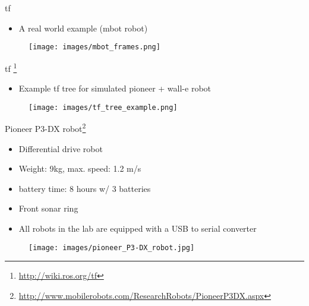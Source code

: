 \documentclass{beamer}
\begin{document}

\begin{frame}{tf}
	\begin{itemize}
		\item A real world example (mbot robot)
	\end{itemize}
	
	\begin{figure}[H]
		\centering
		\texttt{[image: images/mbot\_frames.png]}
	\end{figure}
	
\end{frame}


\begin{frame}{tf \footnote{\url{http://wiki.ros.org/tf}}}
	\begin{itemize}
		\item Example tf tree for simulated pioneer + wall-e robot
	\end{itemize}
	
	\begin{figure}[H]
		\centering
		\texttt{[image: images/tf\_tree\_example.png]}
	\end{figure}
	
\end{frame}


\begin{frame}{Pioneer P3-DX robot\footnote{\url{http://www.mobilerobots.com/ResearchRobots/PioneerP3DX.aspx}}}
	\begin{itemize}
		\item Differential drive robot
		\item Weight: 9kg, max. speed: 1.2 m/s
		\item battery time: 8 hours w/ 3 batteries
		\item Front sonar ring
		\item All robots in the lab are equipped with a USB to serial converter
	\end{itemize}
	
	\begin{figure}[H]
		\centering
		\texttt{[image: images/pioneer\_P3-DX\_robot.jpg]}
	\end{figure}
	
\end{frame}
\end{document}
